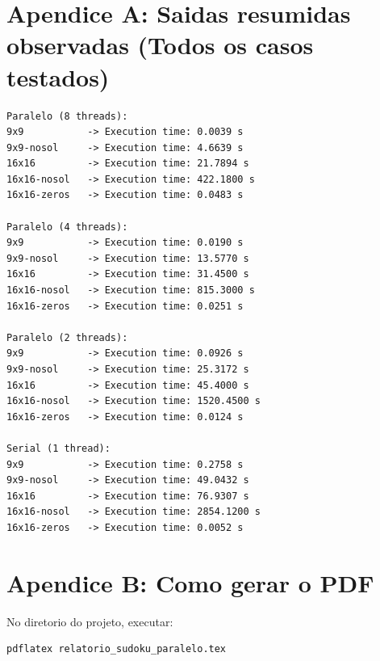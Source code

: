 \documentclass[11pt,a4paper]{article}
\begin{document}
\section*{Apendice A: Saidas resumidas observadas (Todos os casos testados)}
\begin{lstlisting}[basicstyle=\ttfamily\scriptsize,frame=single]
Paralelo (8 threads):
9x9           -> Execution time: 0.0039 s
9x9-nosol     -> Execution time: 4.6639 s
16x16         -> Execution time: 21.7894 s
16x16-nosol   -> Execution time: 422.1800 s
16x16-zeros   -> Execution time: 0.0483 s

Paralelo (4 threads):
9x9           -> Execution time: 0.0190 s
9x9-nosol     -> Execution time: 13.5770 s
16x16         -> Execution time: 31.4500 s
16x16-nosol   -> Execution time: 815.3000 s
16x16-zeros   -> Execution time: 0.0251 s

Paralelo (2 threads):
9x9           -> Execution time: 0.0926 s
9x9-nosol     -> Execution time: 25.3172 s
16x16         -> Execution time: 45.4000 s
16x16-nosol   -> Execution time: 1520.4500 s
16x16-zeros   -> Execution time: 0.0124 s

Serial (1 thread):
9x9           -> Execution time: 0.2758 s
9x9-nosol     -> Execution time: 49.0432 s
16x16         -> Execution time: 76.9307 s
16x16-nosol   -> Execution time: 2854.1200 s
16x16-zeros   -> Execution time: 0.0052 s
\end{lstlisting}

\section*{Apendice B: Como gerar o PDF}
No diretorio do projeto, executar:
\begin{lstlisting}[basicstyle=\ttfamily\small,frame=single]
pdflatex relatorio_sudoku_paralelo.tex
\end{lstlisting}
\end{document}
